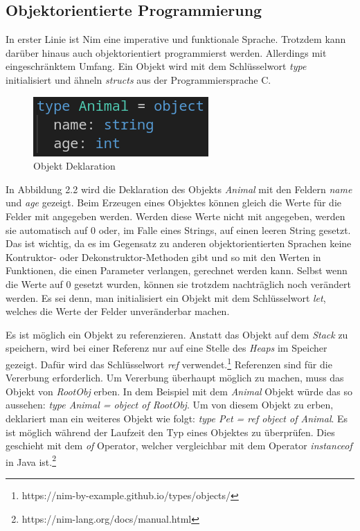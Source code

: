 \documentclass[11pt]{report}
\begin{document}
\subsection{Objektorientierte Programmierung}
In erster Linie ist Nim eine imperative und funktionale Sprache. Trotzdem kann darüber hinaus auch objektorientiert programmierst werden. Allerdings mit eingeschränktem Umfang.
Ein Objekt wird mit dem Schlüsselwort \emph{type} initialisiert und ähneln \emph{structs} aus der Programmiersprache C.
\begin{figure}[htp]
\centering
\includegraphics[scale=0.50]{images/image1.png}
\caption{Objekt Deklaration}
\label{}
\end{figure}
In Abbildung 2.2 wird die Deklaration des Objekts \emph{Animal} mit den Feldern \emph{name} und \emph{age} gezeigt. Beim Erzeugen eines Objektes können gleich die Werte für die Felder mit angegeben werden. Werden diese Werte nicht mit angegeben, werden sie automatisch auf 0 oder, im Falle eines Strings, auf einen leeren String gesetzt. Das ist wichtig, da es im Gegensatz zu anderen objektorientierten Sprachen keine Kontruktor- oder Dekonstruktor-Methoden gibt und so mit den Werten in Funktionen, die einen Parameter verlangen, gerechnet werden kann. Selbst wenn die Werte auf 0 gesetzt wurden, können sie trotzdem nachträglich noch verändert werden. Es sei denn, man initialisiert ein Objekt mit dem Schlüsselwort \emph{let}, welches die Werte der Felder unveränderbar machen.

Es ist möglich ein Objekt zu referenzieren. Anstatt das Objekt auf dem \emph{Stack} zu speichern, wird bei einer Referenz nur auf eine Stelle des \emph{Heaps} im Speicher gezeigt. Dafür wird das Schlüsselwort \emph{ref} verwendet.\footnote{https://nim-by-example.github.io/types/objects/}
Referenzen sind für die Vererbung erforderlich. Um Vererbung überhaupt möglich zu machen, muss das Objekt von \emph{RootObj} erben. In dem Beispiel mit dem \emph{Animal} Objekt würde das so aussehen: \emph{type Animal = object of RootObj}. Um von diesem Objekt zu erben, deklariert man ein weiteres Objekt wie folgt: \emph{type Pet = ref object of Animal}.
Es ist möglich während der Laufzeit den Typ eines Objektes zu überprüfen.
Dies geschieht mit dem \emph{of} Operator, welcher vergleichbar mit dem Operator \emph{instanceof} in Java ist.\footnote{https://nim-lang.org/docs/manual.html}
\end{document}
